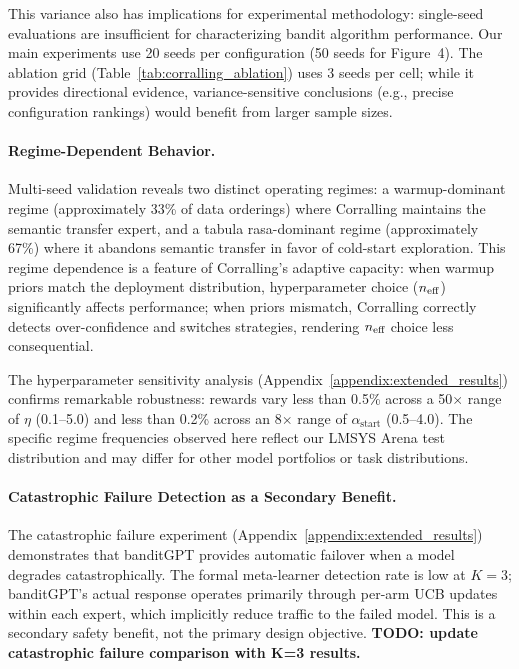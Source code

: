 This variance also has implications for experimental methodology: single-seed
evaluations are insufficient for characterizing bandit algorithm performance.
Our main experiments use 20 seeds per configuration (50 seeds for Figure~4).
The ablation grid (Table~\ref{tab:corralling_ablation}) uses 3 seeds per cell;
while it provides directional evidence, variance-sensitive conclusions
(e.g., precise configuration rankings) would benefit from larger sample sizes.

\paragraph{Regime-Dependent Behavior.}
Multi-seed validation reveals two distinct operating regimes: a
warmup-dominant regime (approximately 33\% of data orderings) where Corralling
maintains the semantic transfer expert, and a tabula rasa-dominant regime
(approximately 67\%) where it abandons semantic transfer in favor of cold-start
exploration.
This regime dependence is a feature of Corralling's adaptive capacity: when
warmup priors match the deployment distribution, hyperparameter choice
($n_{\text{eff}}$) significantly affects performance; when priors mismatch, Corralling
correctly detects over-confidence and switches strategies, rendering
$n_{\text{eff}}$ choice less consequential.

The hyperparameter sensitivity analysis
(Appendix~\ref{appendix:extended_results}) confirms remarkable robustness:
rewards vary less than 0.5\% across a 50$\times$ range of $\eta$
(0.1--5.0) and less than 0.2\% across an 8$\times$ range of $\alpha_{\text{start}}$ (0.5--4.0).
The specific regime frequencies observed here reflect our LMSYS Arena test
distribution and may differ for other model portfolios or task distributions.

\paragraph{Catastrophic Failure Detection as a Secondary Benefit.}
The catastrophic failure experiment
(Appendix~\ref{appendix:extended_results}) demonstrates that
banditGPT provides automatic failover when a model degrades catastrophically.
The formal meta-learner detection rate is low at $K{=}3$; banditGPT's actual response operates primarily through
per-arm UCB updates within each expert, which implicitly reduce traffic to
the failed model.
This is a secondary safety benefit, not the primary design objective.
\textbf{TODO: update catastrophic failure comparison with K=3 results.}

